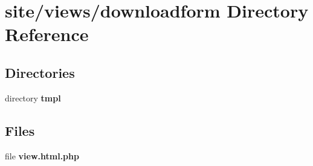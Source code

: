 \section{site/views/downloadform Directory Reference}
\label{dir_b688ab77ffc2f7c2a76370c3fe79fab7}
\subsection*{Directories}
\begin{DoxyCompactItemize}
\item 
directory \textbf{ tmpl}
\end{DoxyCompactItemize}
\subsection*{Files}
\begin{DoxyCompactItemize}
\item 
file \textbf{ view.\+html.\+php}
\end{DoxyCompactItemize}
